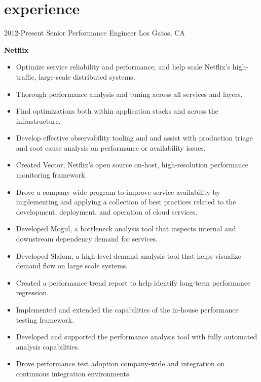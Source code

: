 \section{experience}

\begin{entrylist}
  \entry
    {2012-Present}
    {Senior Performance Engineer}
    {Los Gatos, CA}
    {
      \textbf{Netflix}
      \begin{itemize}
        \item Optimize service reliability and performance, and help scale Netflix's high-traffic, large-scale distributed systems.
        \item Thorough performance analysis and tuning across all services and layers.
        \item Find optimizations both within application stacks and across the infrastructure.
        \item Develop effective observability tooling and and assist with production triage and root cause analysis on performance or availability issues.  
      \end{itemize}
      \begin{itemize}
        \item Created Vector, Netflix's open source on-host, high-resolution performance monitoring framework.
        \item Drove a company-wide program to improve service availability by implementing and applying a collection of best practices related to the development, deployment, and operation of cloud services.
        \item Developed Mogul, a bottleneck analysis tool that inspects internal and downstream dependency demand for services.
        \item Developed Slalom, a high-level demand analysis tool that helps visualize demand flow on large scale systems.
        \item Created a performance trend report to help identify long-term performance regression.
        \item Implemented and extended the capabilities of the in-house performance testing framework.
        \item Developed and supported the performance analysis tool with fully automated analysis capabilities.
        \item Drove performance test adoption company-wide and integration on continuous integration environments.
      \end{itemize}
    }
  \entry

\end{entrylist}

